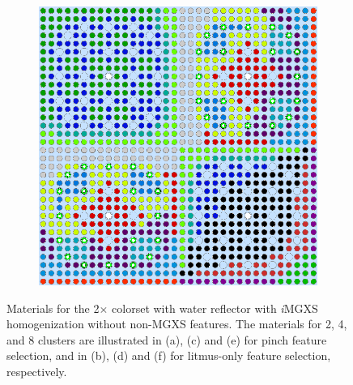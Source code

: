\begin{appendices}
\begin{figure}[h!]
\begin{subfigure}{0.48\textwidth}
  \caption{}
  \label{fig:no-features-reflector-pinch-8}
\end{subfigure}%
\begin{subfigure}{0.48\textwidth}
  \centering
  \includegraphics[width=0.85\linewidth]{figures/unsupervised/geometries/without-features/8-clusters/combined/reflector}
  \caption{}
  \label{fig:no-features-reflector-combined-8}
\end{subfigure}
\caption[Clustered geometries without non-MGXS features]{Materials for the 2$\times$ colorset with water reflector with \textit{i}\ac{MGXS} homogenization without non-\ac{MGXS} features. The materials for 2, 4, and 8 clusters are illustrated in (a), (c) and (e) for pinch feature selection, and in (b), (d) and (f) for litmus-only feature selection, respectively.}
\label{fig:no-features-reflector-geometries}
\end{figure}

\clearpage


\end{appendices}
